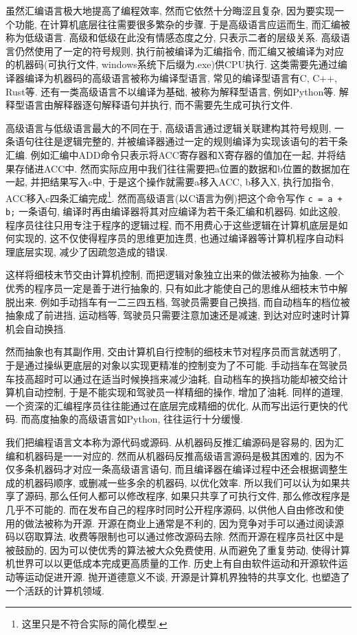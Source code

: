         虽然汇编语言极大地提高了编程效率, 然而它依然十分晦涩且复杂, 因为要实现一个功能, 在计算机底层往往需要很多繁杂的步骤. 于是高级语言应运而生, 而汇编被称为低级语言. 高级和低级在此没有情感态度之分, 只表示二者的层级关系. 高级语言仍然使用了一定的符号规则, 执行前被编译为汇编指令, 而汇编又被编译为对应的机器码(可执行文件, windows系统下后缀为.exe)供CPU执行. 这类需要先通过编译器编译为机器码的高级语言被称为编译型语言, 常见的编译型语言有C, C++, Rust等. 还有一类高级语言不以编译为基础, 被称为解释型语言, 例如Python等. 解释型语言由解释器逐句解释语句并执行, 而不需要先生成可执行文件.
        
        高级语言与低级语言最大的不同在于, 高级语言通过逻辑关联建构其符号规则, 一条语句往往是逻辑完整的, 并被编译器通过一定的规则编译为实现该语句的若干条汇编. 例如汇编中ADD命令只表示将ACC寄存器和X寄存器的值加在一起, 并将结果存储进ACC中. 然而实际应用中我们往往需要把a位置的数据和b位置的数据加在一起, 并把结果写入c中, 于是这个操作就需要a移入ACC, b移入X, 执行加指令, ACC移入c四条汇编完成\footnote{这里只是不符合实际的简化模型.}. 然而高级语言(以C语言为例)把这个命令写作 \texttt{c = a + b;} 一条语句, 编译时再由编译器将其对应编译为若干条汇编和机器码. 如此这般, 程序员往往只用专注于程序的逻辑过程, 而不用费心于这些逻辑在计算机底层是如何实现的, 这不仅使得程序员的思维更加连贯, 也通过编译器等计算机程序自动料理底层实现, 减少了因疏忽造成的错误.

        这样将细枝末节交由计算机控制, 而把逻辑对象独立出来的做法被称为抽象. 一个优秀的程序员一定是善于进行抽象的, 只有如此才能使自己的思维从细枝末节中解脱出来. 例如手动挡车有一二三四五档, 驾驶员需要自己换挡, 而自动档车的档位被抽象成了前进挡, 运动档等, 驾驶员只需要注意加速还是减速, 到达对应时速时计算机会自动换挡. 
        
        然而抽象也有其副作用, 交由计算机自行控制的细枝末节对程序员而言就透明了, 于是通过操纵更底层的对象以实现更精准的控制变为了不可能. 手动挡车在驾驶员车技高超时可以通过在适当时候换挡来减少油耗, 自动档车的换挡功能却被交给计算机自动控制, 于是不能实现和驾驶员一样精细的操作, 增加了油耗. 同样的道理, 一个资深的汇编程序员往往能通过在底层完成精细的优化, 从而写出运行更快的代码. 而高度抽象的高级语言如Python, 往往运行十分缓慢.

        我们把编程语言文本称为源代码或源码. 从机器码反推汇编源码是容易的, 因为汇编和机器码是一一对应的. 然而从机器码反推高级语言源码是极其困难的, 因为不仅多条机器码才对应一条高级语言语句, 而且编译器在编译过程中还会根据调整生成的机器码顺序, 或删减一些多余的机器码, 以优化效率. 所以我们可以认为如果共享了源码, 那么任何人都可以修改程序, 如果只共享了可执行文件, 那么修改程序是几乎不可能的. 而在发布自己的程序时同时公开程序源码, 以供他人自由修改和使用的做法被称为开源. 开源在商业上通常是不利的, 因为竞争对手可以通过阅读源码以窃取算法, 收费等限制也可以通过修改源码去除. 然而开源在程序员社区中是被鼓励的, 因为可以使优秀的算法被大众免费使用, 从而避免了重复劳动, 使得计算机世界可以以更低成本完成更高质量的工作. 历史上有自由软件运动和开源软件运动等运动促进开源. 抛开道德意义不谈, 开源是计算机界独特的共享文化, 也塑造了一个活跃的计算机领域.


